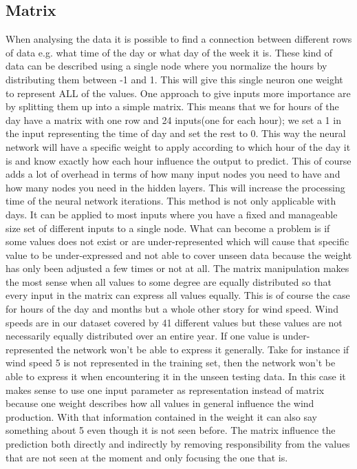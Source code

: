 \subsection{Matrix}
\label{sec:Matrix}
When analysing the data it is possible to find a connection between different rows of data e.g. what time of the day or what day of the week it is. These kind of data can be described using a single node where you normalize the hours by distributing them between -1 and 1. This will give this single neuron one weight to represent ALL of the values. One approach to give inputs more importance are by splitting them up into a simple matrix. This means that we for hours of the day have a matrix with one row and 24 inputs(one for each hour); we set a 1 in the input representing the time of day and set the rest to 0. This way the neural network will have a specific weight to apply according to which hour of the day it is and know exactly how each hour influence the output to predict. This of course adds a lot of overhead in terms of how many input nodes you need to have and how many nodes you need in the hidden layers. This will increase the processing time of the neural network iterations. This method is not only applicable with days. It can be applied to most inputs where you have a fixed and manageable size set of different inputs to a single node. What can become a problem is if some values does not exist or are under-represented which will cause that specific value to be under-expressed and not able to cover unseen data because the weight has only been adjusted a few times or not at all. The matrix manipulation makes the most sense when all values to some degree are equally distributed so that every input in the matrix can express all values equally. This is of course the case for hours of the day and months but a whole other story for wind speed. Wind speeds are in our dataset covered by 41 different values but these values are not necessarily equally distributed over an entire year. If one value is under-represented the network won't be able to express it generally. Take for instance if wind speed 5 is not represented in the training set, then the network won't be able to express it when encountering it in the unseen testing data. In this case it makes sense to use one input parameter as representation instead of matrix because one weight describes how all values in general influence the wind production. With that information contained in the weight it can also say something about 5 even though it is not seen before. The matrix influence the prediction both directly and indirectly by removing responsibility from the values that are not seen at the moment and only focusing the one that is.

